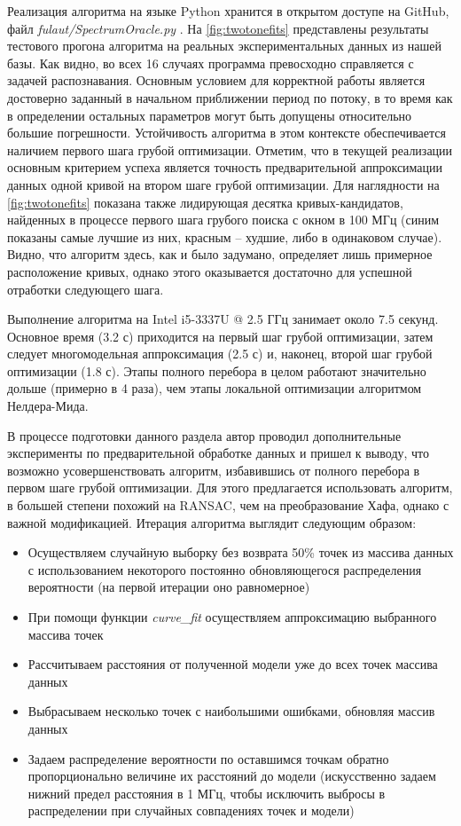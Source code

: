 \documentclass[14pt, a4paper]{extreport}
\numberwithin{equation}{section}
\begin{document}
Реализация алгоритма на языке Python хранится в открытом доступе на GitHub, файл \foreignlanguage{english}{\textit{fulaut/SpectrumOracle.py}} \cite{fedorov2021github}. На \autoref{fig:twotonefits} представлены результаты тестового прогона алгоритма на реальных экспериментальных данных из нашей базы. Как видно, во всех 16 случаях программа превосходно справляется с задачей распознавания. Основным условием для корректной работы является достоверно заданный в начальном приближении период по потоку, в то время как в определении остальных параметров могут быть допущены относительно большие погрешности. Устойчивость алгоритма в этом контексте обеспечивается наличием первого шага грубой оптимизации. Отметим, что в текущей реализации основным критерием успеха является точность предварительной аппроксимации данных одной кривой на втором шаге грубой оптимизации. Для наглядности на \autoref{fig:twotonefits} показана также лидирующая десятка кривых-кандидатов, найденных в процессе первого шага грубого поиска с окном в 100 МГц (синим показаны самые лучшие из них, красным -- худшие, либо в одинаковом случае). Видно, что алгоритм здесь, как и было задумано, определяет лишь примерное расположение кривых, однако этого оказывается достаточно для успешной отработки следующего шага.

Выполнение алгоритма на Intel i5-3337U @ 2.5 ГГц занимает около 7.5 секунд. Основное время (3.2 с) приходится на первый шаг грубой оптимизации, затем следует многомодельная аппроксимация (2.5 с) и, наконец, второй шаг грубой оптимизации (1.8 с). Этапы полного перебора в целом работают значительно дольше (примерно в 4 раза), чем этапы локальной оптимизации алгоритмом Нелдера-Мида.

В процессе подготовки данного раздела автор проводил дополнительные эксперименты по предварительной обработке данных и пришел к выводу, что возможно усовершенствовать алгоритм, избавившись от полного перебора в первом шаге грубой оптимизации. Для этого предлагается использовать алгоритм, в большей степени похожий на RANSAC, чем на преобразование Хафа, однако с важной модификацией. Итерация алгоритма выглядит следующим образом:
\begin{itemize}
	\item Осуществляем случайную выборку без возврата 50\% точек из массива данных с использованием некоторого постоянно обновляющегося распределения вероятности (на первой итерации оно равномерное)
	\item При помощи функции \foreignlanguage{english}{\textit{curve\_fit}} осуществляем аппроксимацию выбранного массива точек
	\item Рассчитываем расстояния от полученной модели уже до всех точек массива данных
	\item Выбрасываем несколько точек с наибольшими ошибками, обновляя массив данных
	\item Задаем распределение вероятности по оставшимся точкам обратно пропорционально величине их расстояний до модели (искусственно задаем нижний предел расстояния в 1 МГц, чтобы исключить выбросы в распределении при случайных совпадениях точек и модели)
\end{itemize}
\end{document}
